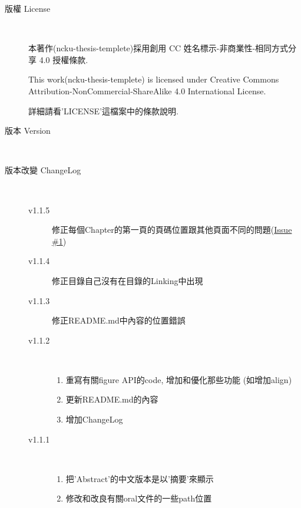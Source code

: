 \begin{description}
  \item[版權 License] \hfill \\

    本著作(ncku-thesis-templete)採用創用 CC 姓名標示-非商業性-相同方式分享 4.0 授權條款.

    This work(ncku-thesis-templete) is licensed under Creative Commons Attribution-NonCommercial-ShareAlike 4.0 International License.

  詳細請看'LICENSE'這檔案中的條款說明.

  \item[版本 Version] \hfill \\
    \ThisThesisVersion

  \item[版本改變 ChangeLog] \hfill \\
    \begin{description}
      \item[v1.1.5] 修正每個Chapter的第一頁的頁碼位置跟其他頁面不同的問題(\href{https://github.com/wengan-li/ncku-thesis-templete-latex/issues/1}{Issue \#1})

      \item[v1.1.4] 修正目錄自己沒有在目錄的Linking中出現

      \item[v1.1.3] 修正README.md中內容的位置錯誤

      \item[v1.1.2] \hfill \\
        \begin{enumerate}
          \item 重寫有關figure API的code, 增加和優化那些功能 (如增加align)
          \item 更新README.md的內容
          \item 增加ChangeLog
        \end{enumerate}

      \item[v1.1.1] \hfill \\
        \begin{enumerate}
          \item 把'Abstract'的中文版本是以'摘要'來顯示
          \item 修改和改良有關oral文件的一些path位置
        \end{enumerate}


\end{description}
\end{description}

